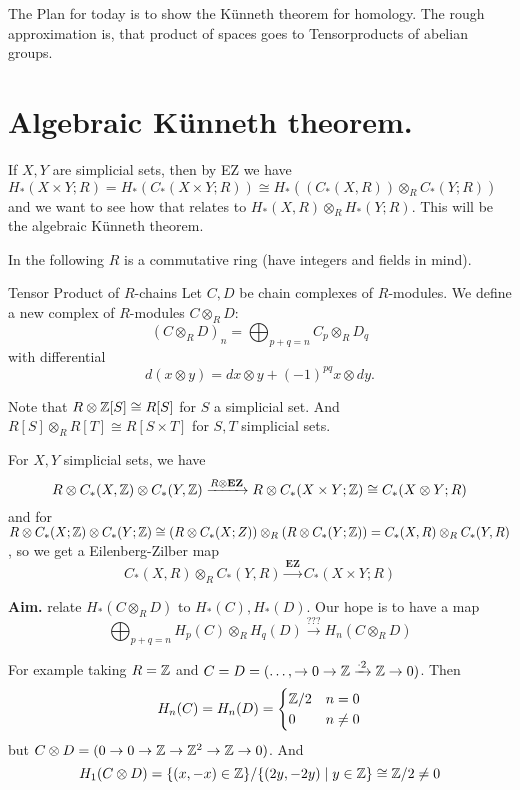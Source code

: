 \documentclass[language=english]{TemplateLecture}
\begin{document}


The Plan for today is to show the Künneth theorem for homology. The rough approximation is, that product of spaces goes to Tensorproducts of abelian groups.

\section{Algebraic Künneth theorem.}

If \(X,Y\) are simplicial sets, then by EZ we have \(H_*(X\times Y; R) = H_*(C_*(X\times Y; R)) \cong H_*((C_*(X,R)) \otimes_R C_*(Y; R))\) and we want to see how that relates to \(H_*(X,R) \otimes_R H_*(Y; R)\). This will be the algebraic Künneth theorem.

In the following \(R\) is a commutative ring (have integers and fields in mind).

\begin{defi}{Tensor Product of \(R\)-chains}{}
Let \(C,D\) be chain complexes of \(R\)-modules. We define a new complex of \(R\)-modules \(C \otimes_R D\):
\[(C\otimes_R D)_n = \bigoplus_{p+q = n} C_p \otimes_R D_q\]
with differential
\[d(x\otimes y) = dx \otimes y + (-1)^{pq} x\otimes dy.\]
\end{defi}

Note that \(R \otimes \mathbb{Z}[S] \cong R[S]\) for \(S\) a simplicial set. And \(R[S] \otimes_R R [T] \cong R[S\times T]\) for \(S,T\) simplicial sets.

For \(X,Y\) simplicial sets, we have
\[R\otimes C_*(X,\mathbb{Z}) \otimes C_*(Y,\mathbb{Z}) \xrightarrow{R\otimes \mathbf{EZ}} R\otimes C_*(X\times Y; \mathbb{Z}) \cong C_*(X\otimes Y; R)\]
and for \(R\otimes C_*(X; \mathbb{Z}) \otimes C_*(Y; \mathbb{Z}) \cong (R\otimes C_*(X;Z)) \otimes_R (R \otimes C_*(Y; \mathbb{Z})) = C_*(X,R) \otimes_R C_*(Y,R)\), so we get a Eilenberg-Zilber map
\[C_*(X,R)\otimes_R C_*(Y,R) \xrightarrow{\mathbf{EZ}} C_*(X\times Y; R)\]

\textbf{Aim.} relate \(H_*(C\otimes_R D)\) to \(H_*(C), H_*(D)\). Our hope is to have a map
\[\bigoplus_{p+q = n} H_p(C) \otimes_R H_q(D) \xrightarrow{???} H_n(C\otimes_R D)\]

For example taking \(R = \mathbb{Z}\) and \(C = D = (\dots ,\rightarrow 0\rightarrow \mathbb{Z} \xrightarrow{\cdot 2}\mathbb{Z} \rightarrow 0)\). Then
\[H_n(C) = H_n(D) = \begin{cases}
    \mathbb{Z}/2 & n = 0 \\
    0 & n \neq 0 \\
\end{cases}\]
but \(C \otimes D = (0\rightarrow 0 \rightarrow \mathbb{Z} \rightarrow \mathbb{Z}^2 \rightarrow \mathbb{Z} \rightarrow 0)\). And 
\[H_1(C\otimes D) = \{(x,-x) \in \mathbb{Z}\}/\{(2y, -2y) \mid y\in \mathbb{Z}\} \cong \mathbb{Z}/2 \neq 0\]
\end{document}

